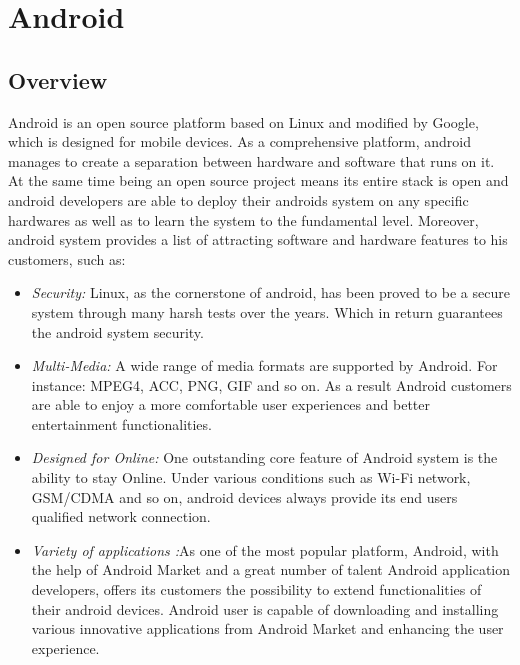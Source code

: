 \section{Android}
\subsection{Overview}
Android is an open source platform based on Linux and modified by Google, which is designed for mobile devices. As a comprehensive platform, android manages to create a separation between hardware and software that runs on it.  At the same time being an open source project means its entire stack is open and android developers are able to deploy their androids system on any specific hardwares as well as to learn the system to the fundamental level.\cite{learn_android}
Moreover, android system provides a list of attracting software and hardware features to his customers, such as:
\begin{itemize}
\item \emph{Security:} Linux, as the cornerstone of android, has been proved to be a secure system through many harsh tests over the years. Which in return guarantees the android system security. \cite{learn_android}
\item \emph{Multi-Media:} A wide range of media formats are supported by Android. For instance: MPEG4, ACC, PNG, GIF and so on\cite{android_media}. As a result Android customers are able to enjoy a more comfortable user experiences and better entertainment functionalities.
\item \emph{Designed for Online:} One outstanding core feature of Android system is the ability to stay Online\cite{android_forensics}. Under various conditions such as Wi-Fi network, GSM/CDMA and so on, android devices always provide its end users qualified network connection.
\item \emph{Variety of applications :}As one of the most popular platform,  Android, with the help of Android Market and a great number of talent Android application developers, offers its customers the possibility to extend  functionalities of their android devices\cite{android_forensics}. Android user is capable of downloading and installing various innovative applications from Android Market and enhancing the user experience.
\end{itemize}
